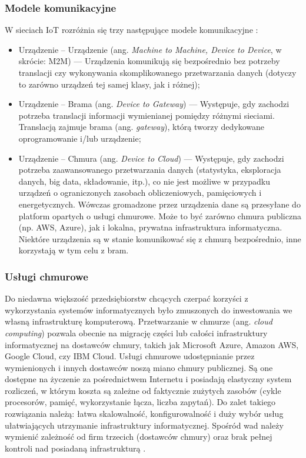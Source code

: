 \documentclass[a4paper, 12pt, twoside]{article}
\begin{document}
\subsubsection*{Modele komunikacyjne}

W sieciach IoT rozróżnia się trzy następujące modele komunikacyjne \cite{intro-to-iot}:

\begin{itemize}
    \itemsep0em 
    \item Urządzenie -- Urządzenie (ang. \emph{Machine to Machine, Device to Device}, w skrócie: M2M)
    --- Urządzenia komunikują się bezpośrednio bez potrzeby translacji czy wykonywania 
    skomplikowanego przetwarzania danych (dotyczy to zarówno urządzeń tej samej klasy, jak i różnej);
    \item Urządzenie -- Brama (ang. \emph{Device to Gateway})
    --- Występuje, gdy zachodzi potrzeba translacji informacji wymienianej pomiędzy różnymi sieciami.
    Translacją zajmuje brama (ang. \emph{gateway}), którą tworzy dedykowane oprogramowanie i/lub urządzenie;
    \item Urządzenie -- Chmura (ang. \emph{Device to Cloud})
    --- Występuje, gdy zachodzi potrzeba zaawansowanego przetwarzania danych 
    (statystyka, eksploracja danych, big data, składowanie, itp.), 
    co nie jest możliwe w przypadku urządzeń o ograniczonych zasobach obliczeniowych, 
    pamięciowych i energetycznych. Wówczas gromadzone przez urządzenia dane są 
    przesyłane do platform opartych o usługi chmurowe. Może to być zarówno chmura publiczna 
    (np. AWS, Azure), jak i lokalna, prywatna infrastruktura informatyczna. 
    Niektóre urządzenia są w stanie komunikować się z chmurą bezpośrednio, inne
    korzystają w tym celu z bram.
\end{itemize}

\subsubsection{Usługi chmurowe}

Do niedawna większość przedsiębiorstw chcących czerpać korzyści z wykorzystania
systemów informatycznych było zmuszonych do inwestowania we własną infrastrukturę
komputerową. Przetwarzanie w chmurze (ang. \emph{cloud computing}) pozwala obecnie 
na migrację części lub całości infrastruktury informatycznej na dostawców chmury,
takich jak Microsoft Azure, Amazon AWS, Google Cloud, czy IBM Cloud. Usługi chmurowe
udostępnianie przez wymienionych i innych dostawców noszą miano chmury publicznej. 
Są one dostępne na życzenie za pośrednictwem Internetu i posiadają elastyczny
system rozliczeń, w którym koszta są zależne od faktycznie zużytych zasobów
(cykle procesorów, pamięć, wykorzystanie łącza, liczba zapytań). Do zalet takiego
rozwiązania należą: łatwa skalowalność, konfigurowalność i duży wybór usług
ułatwiających utrzymanie infrastruktury informatycznej. Spośród wad należy wymienić
zależność od firm trzecich (dostawców chmury) oraz brak pełnej kontroli nad 
posiadaną infrastrukturą \cite{iot-hype-to-reality}.
\end{document}
